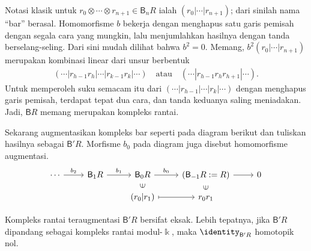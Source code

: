 Notasi klasik untuk
$r_0\otimes\cdots\otimes r_{n+1}\in\mathsf{B}_nR$ ialah
$(r_0|\cdots|r_{n+1})$; dari sinilah nama ``bar'' berasal. Homomorfisme $b$
bekerja dengan menghapus satu garis pemisah dengan segala cara yang mungkin,
lalu menjumlahkan hasilnya dengan tanda berselang-seling. Dari sini mudah
dilihat bahwa $b^2=0$. Memang,
$b^2(r_0|\cdots|r_{n+1})$ merupakan kombinasi linear dari unsur berbentuk
\begin{gather*}
	(\cdots |r_{h-1} r_h| \cdots |r_{k-1} r_k| \cdots )
	\quad \text{atau} \quad
	( \cdots | r_{h-1} r_h r_{h+1} | \cdots ).
\end{gather*}
Untuk memperoleh suku semacam itu dari
$(\cdots|r_{h-1}|\cdots|r_k|\cdots)$ dengan menghapus garis pemisah,
terdapat tepat dua cara, dan tanda keduanya saling meniadakan. Jadi,
$\mathsf{B}R$ memang merupakan kompleks rantai.

Sekarang augmentasikan kompleks bar seperti pada diagram berikut dan tuliskan
hasilnya sebagai $\mathsf{B}'R$. Morfisme $b_0$ pada diagram juga disebut
homomorfisme augmentasi.
\[\begin{tikzcd}[row sep=small]
	\cdots \arrow[r, "b_2"] & \mathsf{B}_1 R \arrow[r, "b_1"]
	& \mathsf{B}_0 R \arrow[r, "b_0"] & (\mathsf{B}_{-1} R := R) \arrow[r] & 0 \\
	& & (r_0 | r_1) \arrow[mapsto, r]
	\arrow[phantom, u, "\in" description, sloped]
	& r_0 r_1 \arrow[phantom, u, "\in" description, sloped] &
\end{tikzcd}\]

\begin{lema}\label{prop:HH-bar-exactness}
	Kompleks rantai teraugmentasi $\mathsf{B}'R$ bersifat eksak. Lebih tepatnya,
	jika $\mathsf{B}'R$ dipandang sebagai kompleks rantai modul-$\Bbbk$, maka
	$\identity_{\mathsf{B}'R}$ homotopik nol.
\end{lema}


